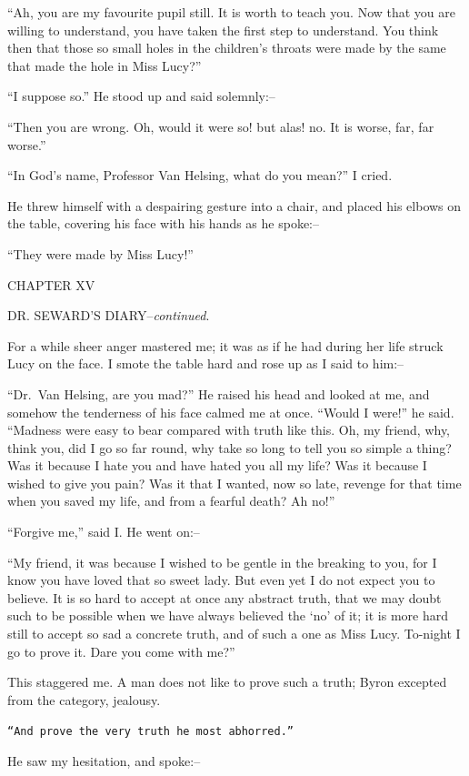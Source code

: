 \documentclass[12pt,openright]{book}
\begin{document}
“Ah, you are my favourite pupil still. It is worth to teach you. Now that you are willing to understand, you have taken the first step to understand. You think then that those so small holes in the children’s throats were made by the same that made the hole in Miss Lucy?”

“I suppose so.” He stood up and said solemnly:–

“Then you are wrong. Oh, would it were so! but alas! no. It is worse, far, far worse.”

“In God’s name, Professor Van Helsing, what do you mean?” I cried.

He threw himself with a despairing gesture into a chair, and placed his elbows on the table, covering his face with his hands as he spoke:–

“They were made by Miss Lucy!”

CHAPTER XV

DR. SEWARD’S DIARY–\textit{continued}.

For a while sheer anger mastered me; it was as if he had during her life struck Lucy on the face. I smote the table hard and rose up as I said to him:–

“Dr. Van Helsing, are you mad?” He raised his head and looked at me, and somehow the tenderness of his face calmed me at once. “Would I were!” he said. “Madness were easy to bear compared with truth like this. Oh, my friend, why, think you, did I go so far round, why take so long to tell you so simple a thing? Was it because I hate you and have hated you all my life? Was it because I wished to give you pain? Was it that I wanted, now so late, revenge for that time when you saved my life, and from a fearful death? Ah no!”

“Forgive me,” said I. He went on:–

“My friend, it was because I wished to be gentle in the breaking to you, for I know you have loved that so sweet lady. But even yet I do not expect you to believe. It is so hard to accept at once any abstract truth, that we may doubt such to be possible when we have always believed the ‘no’ of it; it is more hard still to accept so sad a concrete truth, and of such a one as Miss Lucy. To-night I go to prove it. Dare you come with me?”

This staggered me. A man does not like to prove such a truth; Byron excepted from the category, jealousy.

\texttt{“And prove the very truth he most abhorred.”}

He saw my hesitation, and spoke:–
\end{document}
